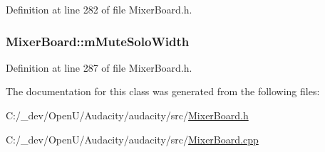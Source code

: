 Definition at line 282 of file Mixer\+Board.\+h.

\subsubsection[{\texorpdfstring{m\+Mute\+Solo\+Width}{mMuteSoloWidth}}]{ Mixer\+Board\+::m\+Mute\+Solo\+Width}\hypertarget{class_mixer_board_adc5c028a80b872f3ab4c8815367e033b}{}\label{class_mixer_board_adc5c028a80b872f3ab4c8815367e033b}


Definition at line 287 of file Mixer\+Board.\+h.



The documentation for this class was generated from the following files\+:\begin{DoxyCompactItemize}
\item 
C\+:/\+\_\+dev/\+Open\+U/\+Audacity/audacity/src/\hyperlink{_mixer_board_8h}{Mixer\+Board.\+h}\item 
C\+:/\+\_\+dev/\+Open\+U/\+Audacity/audacity/src/\hyperlink{_mixer_board_8cpp}{Mixer\+Board.\+cpp}\end{DoxyCompactItemize}
